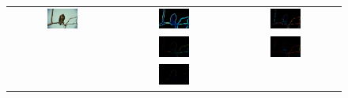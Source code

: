 \begin{figure}[t]
\begin{center}
  \begin{tabular}{ c c c }
  \includegraphics[width=0.3\textwidth]{images/experiments/SE_sPb-OWT-UCM/eagle.png} &
  \includegraphics[width=0.3\textwidth]{images/experiments/SE_sPb-OWT-UCM/eagle_SE-UCM_Pb_not_nms.png} &
  \includegraphics[width=0.3\textwidth]{images/experiments/SE_sPb-OWT-UCM/eagle_SE-UCM_ucm_imageSize.png} \\
  &
  \includegraphics[width=0.3\textwidth]{images/experiments/SE_sPb-OWT-UCM/eagle_gPb-OWT-UCM_gPb_thin.png} &
  \includegraphics[width=0.3\textwidth]{images/experiments/SE_sPb-OWT-UCM/eagle_gPb-OWT-UCM_ucm_imageSize.png} \\
  &
  \includegraphics[width=0.3\textwidth]{images/experiments/SE_sPb-OWT-UCM/eagle_(SE_sPb)-OWT-UCM_gPb_thin.png} &

\end{tabular}
\end{center}
\end{figure}
